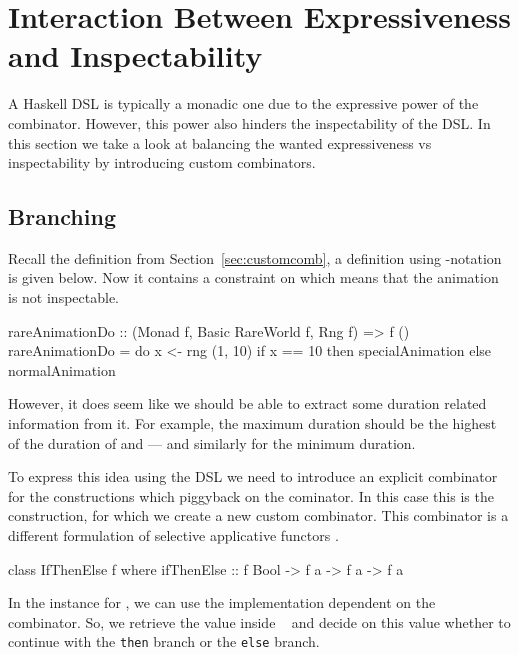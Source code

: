 \section{Interaction Between Expressiveness and Inspectability}
\label{sec:interaction}

A Haskell DSL is typically a monadic one due to the expressive power of the \hs{>>=} combinator. However, this power also hinders the inspectability of the DSL. In this section we take a look at balancing the wanted expressiveness vs inspectability by introducing custom combinators.

\subsection{Branching}

Recall the  definition from Section~\ref{sec:customcomb}, a definition using -notation is given below. Now it contains a  constraint on  which means that the animation is not inspectable.

\begin{code}
rareAnimationDo :: (Monad f, Basic RareWorld f, Rng f) => f ()
rareAnimationDo = do
  x <- rng (1, 10)
  if x == 10
    then specialAnimation
    else normalAnimation
\end{code}

However, it does seem like we should be able to extract some duration related information from it. For example, the maximum duration should be the highest of the duration of  and  --- and similarly for the minimum duration.

To express this idea using the DSL we need to introduce an explicit combinator for the constructions which piggyback on the \hs{>>=} cominator. In this case this is the  construction, for which we create a new custom combinator. This combinator is a different formulation of selective applicative functors \cite{Mokhov:2019:SAF:3352468.3341694}.

\begin{code}
class IfThenElse f where
  ifThenElse :: f Bool -> f a -> f a -> f a
\end{code}

In the instance for , we can use the implementation dependent on the \hs{>>=} combinator. So, we retrieve the value inside ~ and decide on this value whether to continue with the \texttt{then} branch or the \texttt{else} branch.

